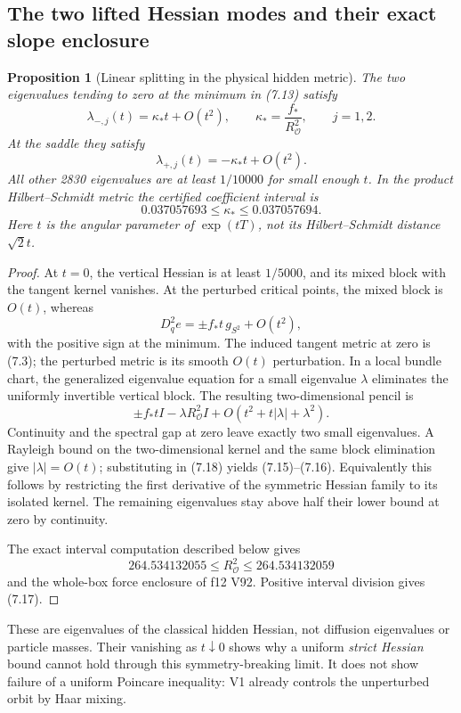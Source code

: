 \documentclass[11pt,oneside]{article}
\newtheorem{proposition}[theorem]{Proposition}
\newcommand{\cO}{\mathcal O}
\begin{document}
\subsection{The two lifted Hessian modes and their exact slope enclosure}

\begin{proposition}[Linear splitting in the physical hidden metric]
\label{prop:f13v2-slope}
The two eigenvalues tending to zero
at the minimum in (7.13) satisfy
\[
 \lambda_{-,j}(t)=\kappa_*t+O(t^2),
       \qquad \kappa_*=\frac{f_*}{R_{\cO}^2},
       \qquad j=1,2.
 \tag{7.15}
\]
At the saddle they satisfy
\[
                     \lambda_{+,j}(t)=-\kappa_*t+O(t^2).
 \tag{7.16}
\]
All other 2830 eigenvalues are
at least \(1/10000\) for small
enough \(t\). In the product
Hilbert--Schmidt metric the
certified coefficient interval is
\[
       0.037057693\le\kappa_*\le0.037057694.
 \tag{7.17}
\]
Here \(t\) is the angular parameter
of \(\exp(tT)\), not its
Hilbert--Schmidt distance \(\sqrt2t\).
\end{proposition}
\begin{proof}
At \(t=0\), the vertical Hessian
is at least \(1/5000\), and its
mixed block with the tangent
kernel vanishes. At the perturbed
critical points, the mixed block
is \(O(t)\), whereas
\[
 D_q^2e=\pm f_*t\,g_{S^2}+O(t^2),
\]
with the positive sign at the
minimum. The induced tangent
metric at zero is (7.3);
the perturbed metric is its
smooth \(O(t)\) perturbation.
In a local bundle chart, the
generalized eigenvalue equation
for a small eigenvalue \(\lambda\)
eliminates the uniformly invertible
vertical block. The resulting
two-dimensional pencil is
\[
        \pm f_*t I-\lambda R_{\cO}^2I
                            +O(t^2+t|\lambda|+\lambda^2).
 \tag{7.18}
\]
Continuity and the spectral gap
at zero leave exactly two small
eigenvalues. A Rayleigh bound on
the two-dimensional kernel and
the same block elimination give
\(|\lambda|=O(t)\); substituting
in (7.18) yields (7.15)--(7.16).
Equivalently this follows by
restricting the first derivative
of the symmetric Hessian family
to its isolated kernel.
The remaining eigenvalues stay
above half their lower bound
at zero by continuity.

The exact interval computation
described below gives
\[
 264.534132055\le R_{\cO}^2\le264.534132059
 \tag{7.19}
\]
and the whole-box force enclosure
of f12 V92. Positive interval
division gives (7.17).
\end{proof}

These are eigenvalues of the
classical hidden Hessian, not
diffusion eigenvalues or particle
masses. Their vanishing as
\(t\downarrow0\) shows why a
uniform \emph{strict Hessian}
bound cannot hold through this
symmetry-breaking limit. It does
not show failure of a uniform
Poincare inequality: V1 already
controls the unperturbed orbit
by Haar mixing.
\end{document}
